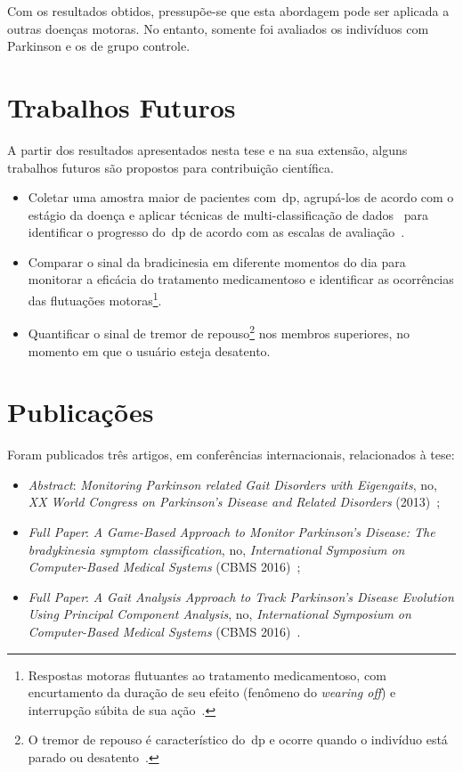 Com os resultados obtidos, pressupõe-se que esta abordagem pode ser aplicada a outras doenças motoras. No entanto, somente foi avaliados os indivíduos com Parkinson e os de grupo controle.

\section{Trabalhos Futuros}\label{section:trabalhos_futuros}
A partir dos resultados apresentados nesta tese e na sua extensão, alguns trabalhos futuros são propostos para contribuição científica.

\begin{itemize}
	\item Coletar uma amostra maior de pacientes com~\ac{dp}, agrupá-los de acordo com o estágio da doença e aplicar técnicas de multi-classificação de dados~\cite{multisvm2011} para identificar o progresso do~\ac{dp} de acordo com as escalas de avaliação~\cite{goul05}.
	\item Comparar o sinal da bradicinesia em diferente momentos do dia para monitorar a eficácia do tratamento medicamentoso e identificar as ocorrências das flutuações motoras\footnote{Respostas motoras flutuantes ao tratamento medicamentoso, com encurtamento da duração de seu efeito (fenômeno do \textit{wearing off}) e interrupção súbita de sua ação~\cite{protpar010}.}.
	\item Quantificar o sinal de tremor de repouso\footnote{O tremor de repouso é característico do~\ac{dp} e ocorre quando o indivíduo está parado ou desatento~\cite{protpar010}.} nos membros superiores, no momento em que o usuário esteja desatento.
	\end{itemize}



\section{Publicações}\label{section:publicacoes}
Foram publicados três artigos, em conferências internacionais, relacionados à tese: 
  \begin{itemize}
   \item \textit{Abstract}: \textit{Monitoring Parkinson related Gait Disorders with Eigengaits}, no, \textit{XX World Congress on Parkinson's Disease and Related Disorders} (2013)~\cite{lmmeigengaits2013};
   \item \textit{Full Paper}: \textit{A Game-Based Approach to Monitor Parkinson’s Disease: The bradykinesia symptom classification}, no, \textit{International Symposium on Computer-Based Medical Systems} (CBMS 2016)~\cite{lmmcbmsgame2016};
   \item \textit{Full Paper}: \textit{A Gait Analysis Approach to Track Parkinson’s Disease Evolution Using Principal Component Analysis}, no, \textit{International Symposium on Computer-Based Medical Systems} (CBMS 2016)~\cite{lmmcbmsgait2016}.
  \end{itemize}




